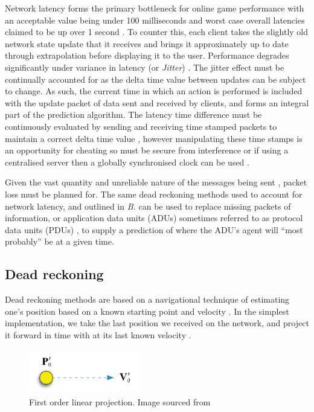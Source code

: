 \documentclass[journal]{IEEEtran}
\begin{document}
Network latency forms the primary bottleneck for online game performance with an acceptable value being under 100 milliseconds \cite{lee2015outatime} \cite{smed2002aspects} and worst case overall latencies claimed to be up over 1 second \cite{claypool2006latency}. To counter this, each client takes the slightly old network state update that it receives and brings it approximately up to date through extrapolation before displaying it to the user. Performance degrades significantly under variance in latency (or \textit{Jitter}) \cite{beigbeder2004effects} \cite{dick2005analysis}. The jitter effect must be continually accounted for as the delta time value between updates can be subject to change. As such, the current time in which an action is performed is included with the update packet of data sent and received by clients, and forms an integral part of the prediction algorithm. The latency time difference must be continuously evaluated by sending and receiving time stamped packets to maintain a correct delta time value \cite{glazer2015multiplayer}, however manipulating these time stamps is an opportunity for cheating \cite{jamin2003cheat} so must be secure from interference or if using a centralised server then a globally synchronised clock can be used \cite{aggarwal2004accuracy}.

Given the vast quantity and unreliable nature of the messages being sent \cite{cronin2001distributed}, packet loss must be planned for. The same dead reckoning methods used to account for network latency, and outlined in \textit{B.} can be used to replace missing packets of information, or application data units (ADUs) \cite{diot1999distributed} sometimes referred to as protocol data units (PDUs) \cite{dis1998ieee}, to supply a prediction of where the ADU's agent will ``most probably'' be at a given time.

\subsection{Dead reckoning}

Dead reckoning methods are based on a navigational technique of estimating one’s position based on a known starting point and velocity \cite{smed2002aspects}. In the simplest implementation, we take the last position we received on the network, and project it forward in time with at its last known velocity \cite{murphy2011believable}.

\begin{figure}[h]
    \centering
    \includegraphics[width=0.3\linewidth]{DR1.png}
    \caption{First order linear projection. Image sourced from \cite{murphy2011believable}}
    \label{fig:dr1}
\end{figure}
\end{document}
